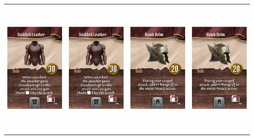 \documentclass{minimal}
\begin{document}
{\begin{longtable}{llll}
\includegraphics[width=44mm,height=68mm]{./29-35/gh-030-studded-leather.png} &
\includegraphics[width=44mm,height=68mm]{./29-35/gh-030-studded-leather.png} &
\includegraphics[width=44mm,height=68mm]{./29-35/gh-031-hawk-helm.png} &
\includegraphics[width=44mm,height=68mm]{./29-35/gh-031-hawk-helm.png}\\ 

\end{longtable}}
\end{document}
